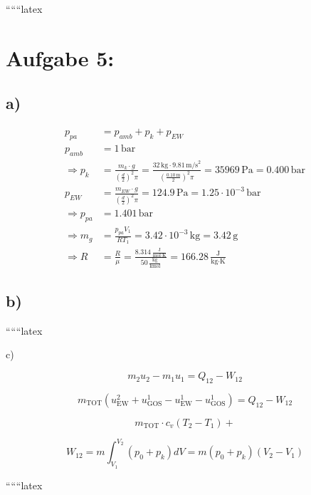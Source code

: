 
``````latex


\section*{Aufgabe 5:}

\subsection*{a)}

\begin{align*}
    p_{pa} &= p_{amb} + p_k + p_{EW} \\
    p_{amb} &= 1 \, \text{bar} \\
    \Rightarrow p_k &= \frac{m_k \cdot g}{\left(\frac{d}{2}\right)^2 \pi} = \frac{32 \, \text{kg} \cdot 9.81 \, \text{m/s}^2}{\left(\frac{0.10 \, \text{m}}{2}\right)^2 \pi} = 35969 \, \text{Pa} = 0.400 \, \text{bar} \\
    p_{EW} &= \frac{m_{EW} \cdot g}{\left(\frac{d}{2}\right)^2 \pi} = 124.9 \, \text{Pa} = 1.25 \cdot 10^{-3} \, \text{bar} \\
    \Rightarrow p_{pa} &= 1.401 \, \text{bar} \\
    \Rightarrow m_g &= \frac{p_{pa} V_1}{R T_1} = 3.42 \cdot 10^{-3} \, \text{kg} = 3.42 \, \text{g} \\
    \Rightarrow R &= \frac{R}{\mu} = \frac{8.314 \, \frac{\text{J}}{\text{mol} \cdot \text{K}}}{50 \, \frac{\text{kg}}{\text{kmol}}} = 166.28 \, \frac{\text{J}}{\text{kg} \cdot \text{K}}
\end{align*}

\subsection*{b)}

``````latex


c) \quad {}

\[
m_2 u_2 - m_1 u_1 = Q_{12} - W_{12}
\]

\[
m_{\text{TOT}} \left( u_{\text{EW}}^2 + u_{\text{GOS}}^1 - u_{\text{EW}}^1 - u_{\text{GOS}}^1 \right) = Q_{12} - W_{12}
\]

\[
m_{\text{TOT}} \cdot c_v \left( T_2 - T_1 \right) +
\]

\[
W_{12} = m \int_{V_1}^{V_2} \left( p_0 + p_k \right) dV = m \left( p_0 + p_k \right) \left( V_2 - V_1 \right)
\]

``````latex



